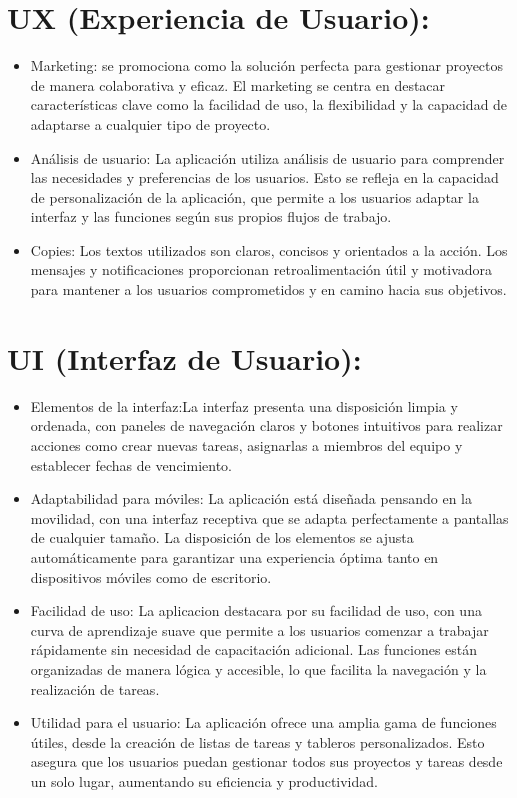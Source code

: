 \section{UX (Experiencia de Usuario):} %
	\begin{itemize}
		\item Marketing: se promociona como la solución perfecta para gestionar proyectos de manera colaborativa y eficaz. El marketing se centra en destacar características clave como la facilidad de uso, la flexibilidad y la capacidad de adaptarse a cualquier tipo de proyecto.
		\item Análisis de usuario: La aplicación utiliza análisis de usuario para comprender las necesidades y preferencias de los usuarios. Esto se refleja en la capacidad de personalización de la aplicación, que permite a los usuarios adaptar la interfaz y las funciones según sus propios flujos de trabajo.
		\item Copies: Los textos utilizados son claros, concisos y orientados a la acción. Los mensajes y notificaciones proporcionan retroalimentación útil y motivadora para mantener a los usuarios comprometidos y en camino hacia sus objetivos.
	\end{itemize}
\label{sec:ux_experiencia_de_usuario_}

\section{UI (Interfaz de Usuario):} %
	\begin{itemize}
		\item Elementos de la interfaz:La interfaz presenta una disposición limpia y ordenada, con paneles de navegación claros y botones intuitivos para realizar acciones como crear nuevas tareas, asignarlas a miembros del equipo y establecer fechas de vencimiento.
		\item Adaptabilidad para móviles: La aplicación está diseñada pensando en la movilidad, con una interfaz receptiva que se adapta perfectamente a pantallas de cualquier tamaño. La disposición de los elementos se ajusta automáticamente para garantizar una experiencia óptima tanto en dispositivos móviles como de escritorio.
		\item Facilidad de uso: La aplicacion destacara por su facilidad de uso, con una curva de aprendizaje suave que permite a los usuarios comenzar a trabajar rápidamente sin necesidad de capacitación adicional. Las funciones están organizadas de manera lógica y accesible, lo que facilita la navegación y la realización de tareas.
		\item Utilidad para el usuario:
		La aplicación ofrece una amplia gama de funciones útiles, desde la creación de listas de tareas y tableros personalizados. Esto asegura que los usuarios puedan gestionar todos sus proyectos y tareas desde un solo lugar, aumentando su eficiencia y productividad.
	\end{itemize}
\label{sec:ui_interfaz_de_usuario_}
